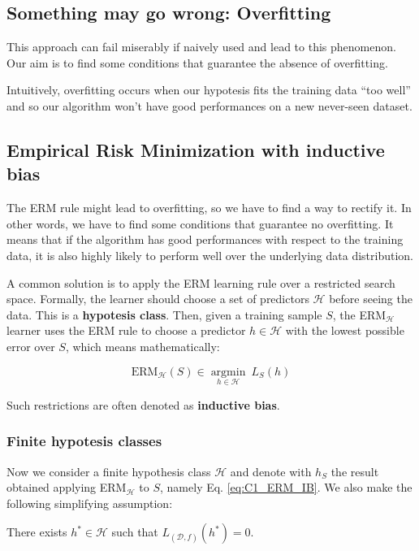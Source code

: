 \documentclass[../../main/main.tex]{subfiles}
\begin{document}
\subsection{Something may go wrong: Overfitting}
This approach can fail miserably if naively used and lead to this phenomenon. Our aim is to find some conditions that guarantee the absence of overfitting.

Intuitively, overfitting occurs when our hypotesis fits the training data ``too well'' and so our algorithm won't have good performances on a new never-seen dataset.



\subsection{Empirical Risk Minimization with inductive bias}
The ERM rule might lead to overfitting, so we have to find a way to rectify it. In other words, we have to find some conditions that guarantee no overfitting. It means that if the algorithm has good performances with respect to the training data, it is also highly likely to perform well over the underlying data distribution.

A common solution is to apply the ERM learning rule over a restricted search space. Formally, the learner should choose a set of predictors \( \mathcal{H} \) before seeing the data. This is a \textbf{hypotesis class}. Then, given a training sample \( S \), the ERM$_\mathcal{H}$ learner uses the ERM rule to choose a predictor \( h \in \mathcal{H} \) with the lowest possible error over \( S \), which means mathematically:

\begin{equation}
    \text{ERM}_\mathcal{H} (S) \in \underset{{h \in \mathcal{H}}}{\operatorname{argmin}} \ L_S (h)
    \label{eq:C1_ERM_IB}
\end{equation}

Such restrictions are often denoted as \textbf{inductive bias}.


\subsubsection*{Finite hypotesis classes}
Now we consider a finite hypothesis class \( \mathcal{H} \) and denote with \( h_S \) the result obtained applying ERM$_\mathcal{H}$ to \( S \), namely Eq. \ref{eq:C1_ERM_IB}. We also make the following simplifying assumption:

\begin{definition}
    There exists \( h^* \in \mathcal{H} \) such that \( L_{(\mathcal{D},f)}(h^*) = 0 \).
\end{definition}
\end{document}
